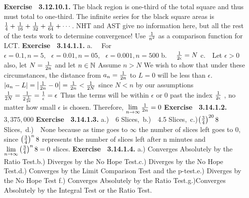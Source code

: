  {\noindent \protect \bf  Exercise ~3.12.10.1.} The black region is one-third of the total square and thus must total to one-third. The infinite series for the black square areas is $\protect \frac  {1}{4}+\protect \frac  {1}{16}+\protect \frac  {1}{32}+\protect \frac  {1}{64}+\protect \cdots  $. NHT and AST give no information here, but all the rest of the tests work to determine convergence! Use $\protect \frac  {1}{n^2}$ as a comparison function for LCT. \protect \newline  \protect \newline  
 {\noindent \protect \bf  Exercise ~3.14.1.1.} a.~~ For $\epsilon = 0.1, n=5,~~~\epsilon = 0.01, n=05,~~~\epsilon = 0.001, n=500$ b.~~ $\protect \frac  {1}{2\epsilon }=N $ c.~~Let $ \epsilon >0$ also, let $N = \protect \frac  {1}{2n}$ and let $n \in \protect \mathbb  {N}$ Assume $n>N$ We wish to show that under these circumstances, the distance from $a_n= \protect \frac  {1}{2n}$ to $L=0$ will be less than $\epsilon $. $\left | a_n-L \right | =\left |\protect \frac  {1}{2n}-0 \right | = \protect \frac  {1}{2n} < \protect \frac  {1}{2N}$ since $N<n$ by our assumptions $ \protect \frac  {1}{2N }=\protect \frac  {1}{2\protect \frac  {1}{2 \epsilon }} = \protect \frac  {1}{\epsilon } = \epsilon $ Thus the terms will be within $\epsilon $ or 0 past the index $\protect \frac  {1}{2 \epsilon }$ , no matter how small $\epsilon $ is chosen. Therefore, $\protect \qopname  \relax m{lim}\limits _{n \to \infty }{\protect \frac  {1}{2n}} = 0$  \protect \newline  \protect \newline  
 {\noindent \protect \bf  Exercise ~3.14.1.2.} $3,375,000$ \protect \newline  \protect \newline  
 {\noindent \protect \bf  Exercise ~3.14.1.3.} a.)~~6 Slices,~b.)~~4.5 Slices,~c.)$\left (\protect \frac  {3}{4} \right )^{20} 8$ Slices,~d.)~~None because as time goes to $\infty $ the number of slices left goes to 0, since $ \left (\protect \frac  {3}{4} \right )^{n} 8$ represents the number of slices left after n minutes and $\protect \qopname  \relax m{lim}\limits _{n \to \infty }{ \left (\protect \frac  {3}{4} \right )^{n} 8} = 0$ slices. \protect \newline  \protect \newline  
 {\noindent \protect \bf  Exercise ~3.14.1.4.} a.) Converges Absolutely by the Ratio Test.\protect \newline  b.) Diverges by the No Hope Test.\protect \newline  c.) Diverges by the No Hope Test.\protect \newline  d.) Converges by the Limit Comparison Test and the p-test.\protect \newline  e.) Diverges by the No Hope Test \protect \newline  f.) Converges Absolutely by the Ratio Test.\protect \newline  g.)Converges Absolutely by the Integral Test or the Ratio Test. \protect \newline  \protect \newline  
